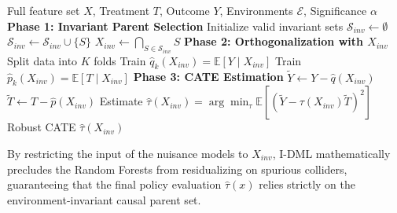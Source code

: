 \begin{algorithm}[H]
\caption{Invariant Double Machine Learning (I-DML)}
\begin{algorithmic}[1]
\REQUIRE Full feature set $X$, Treatment $T$, Outcome $Y$, Environments $\mathcal{E}$, Significance $\alpha$
\STATE \textbf{Phase 1: Invariant Parent Selection}
\STATE Initialize valid invariant sets $\mathcal{S}_{inv} \gets \emptyset$
        \STATE $\mathcal{S}_{inv} \gets \mathcal{S}_{inv} \cup \{S\}$
    \ENDIF
\ENDFOR
\STATE $X_{inv} \gets \bigcap_{S \in \mathcal{S}_{inv}} S$ 
\STATE \textbf{Phase 2: Orthogonalization with $X_{inv}$}
\STATE Split data into $K$ folds
    \STATE Train $\hat{q}_k(X_{inv}) = \mathbb{E}[Y \mid X_{inv}]$ 
    \STATE Train $\hat{p}_k(X_{inv}) = \mathbb{E}[T \mid X_{inv}]$
\ENDFOR
\STATE \textbf{Phase 3: CATE Estimation}
\STATE $\tilde{Y} \gets Y - \hat{q}(X_{inv})$
\STATE $\tilde{T} \gets T - \hat{p}(X_{inv})$
\STATE Estimate $\hat{\tau}(X_{inv}) = \arg\min_{\tau} \mathbb{E}\left[ (\tilde{Y} - \tau(X_{inv}) \tilde{T})^2 \right]$
\ENSURE Robust CATE $\hat{\tau}(X_{inv})$
\end{algorithmic}
\end{algorithm}

By restricting the input of the nuisance models to $X_{inv}$, I-DML mathematically precludes the Random Forests from residualizing on spurious colliders, guaranteeing that the final policy evaluation $\hat{\tau}(x)$ relies strictly on the environment-invariant causal parent set. 

